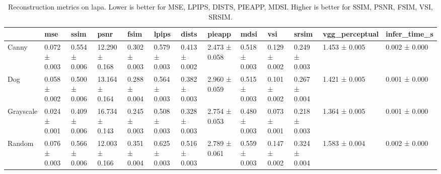 \begin{table}
\caption{Reconstruction metrics on lapa. Lower is better for MSE, LPIPS, DISTS, PIEAPP, MDSI. Higher is better for SSIM, PSNR, FSIM, VSI, SRSIM.}
\label{tab:recon_lapa}
\begin{tabular}{lllllllllllll}
\toprule
 & mse & ssim & psnr & fsim & lpips & dists & pieapp & mdsi & vsi & srsim & vgg_perceptual & infer_time_s \\
\midrule
Canny & 0.072 ± 0.003 & 0.554 ± 0.006 & 12.290 ± 0.168 & 0.302 ± 0.003 & 0.579 ± 0.003 & 0.413 ± 0.002 & 2.473 ± 0.058 & 0.518 ± 0.003 & 0.129 ± 0.002 & 0.249 ± 0.003 & 1.453 ± 0.005 & 0.002 ± 0.000 \\
Dog & 0.058 ± 0.002 & 0.500 ± 0.006 & 13.164 ± 0.164 & 0.288 ± 0.004 & 0.564 ± 0.003 & 0.382 ± 0.003 & 2.960 ± 0.059 & 0.515 ± 0.003 & 0.101 ± 0.002 & 0.267 ± 0.004 & 1.421 ± 0.005 & 0.001 ± 0.000 \\
Grayscale & 0.024 ± 0.001 & 0.409 ± 0.006 & 16.734 ± 0.143 & 0.245 ± 0.003 & 0.508 ± 0.003 & 0.328 ± 0.003 & 2.754 ± 0.053 & 0.480 ± 0.003 & 0.073 ± 0.001 & 0.218 ± 0.003 & 1.364 ± 0.005 & 0.001 ± 0.000 \\
Random & 0.076 ± 0.003 & 0.566 ± 0.006 & 12.003 ± 0.166 & 0.351 ± 0.004 & 0.625 ± 0.003 & 0.516 ± 0.003 & 2.789 ± 0.061 & 0.559 ± 0.003 & 0.147 ± 0.002 & 0.324 ± 0.004 & 1.583 ± 0.004 & 0.002 ± 0.000 \\
\bottomrule
\end{tabular}
\end{table}
